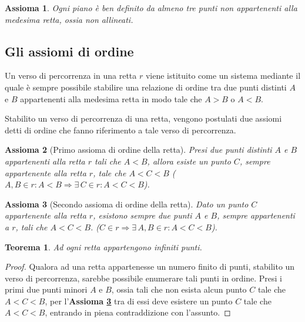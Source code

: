 \documentclass{article}
\newtheorem{axiom}{Assioma}[section]
\newtheorem{theorem}{Teorema}[section]
\theoremstyle{definition}
\begin{document}
\begin{axiom}
    \label{piano:tre_punti}
    Ogni piano è ben definito da almeno tre punti non
    appartenenti alla medesima retta,
    ossia non allineati.
\end{axiom}

\subsection{Gli assiomi di ordine}

Un verso di percorrenza in una retta $r$ viene istituito come
un sistema mediante il quale è sempre possibile stabilire una
relazione di ordine tra due punti distinti $A$ e $B$ appartenenti
alla medesima retta in modo tale che $A>B$ o $A<B$.

Stabilito un verso di percorrenza di una retta, vengono
postulati due assiomi detti di ordine che fanno riferimento
a tale verso di percorrenza.

\begin{axiom}[Primo assioma di ordine della retta]
    Presi due punti distinti $A$ e $B$ appartenenti alla retta $r$
    tali che $A<B$, allora esiste un punto $C$, sempre
    appartenente alla retta $r$, tale che $A<C<B$
    ($A,B \in r : A<B \Rightarrow \exists \, C \in r : A<C<B$).
\end{axiom}

\begin{axiom}[Secondo assioma di ordine della retta]
    \label{retta:secondo_assioma_ordine}
    Dato un punto $C$ appartenente alla retta $r$, esistono
    sempre due punti $A$ e $B$, sempre appartenenti a $r$,
    tali che $A<C<B$.
    ($C \in r \Rightarrow \exists \, A,B \in r : A<C<B$).
\end{axiom}

\begin{theorem}
    \label{retta:infiniti_punti}
    Ad ogni retta appartengono infiniti punti.
\end{theorem}

\begin{proof}
    Qualora ad una retta appartenesse un numero finito di punti,
    stabilito un verso di percorrenza, sarebbe possibile enumerare
    tali punti in ordine. Presi i primi due punti minori $A$ e $B$,
    ossia tali che non esista alcun punto $C$ tale che $A<C<B$, per
    l'\textbf{Assioma \ref{retta:secondo_assioma_ordine}} tra di essi deve
    esistere un punto $C$ tale che $A<C<B$, entrando
    in piena contraddizione con l'assunto.
\end{proof}
\end{document}
